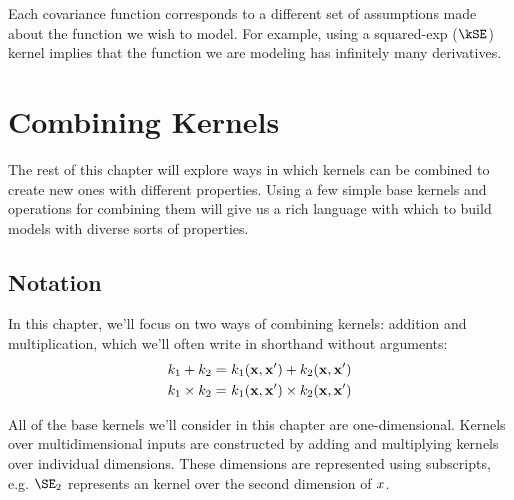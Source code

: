 Each covariance function corresponds to a different set of assumptions made about the function we wish to model.
For example, using a squared-exp ($\kSE$) kernel implies that the function we are modeling has infinitely many derivatives.



\section{Combining Kernels}

The rest of this chapter will explore ways in which kernels can be combined to create new ones with different properties.
Using a few simple base kernels and operations for combining them will give us a rich language with which to build models with diverse sorts of properties.





\subsection{Notation}

In this chapter, we'll focus on two ways of combining kernels: addition and multiplication, which we'll often write in shorthand without arguments:
\begin{align}
k_1 + k_2 =& \,\, k_1({\bf{x}}, {\bf{x}}') + k_2( {\bf{x}}, {\bf{x}}')\\
k_1 \times k_2 =& \,\, k_1({\bf{x}}, {\bf{x}}') \times k_2({\bf{x}}, {\bf{x}}')
\end{align}


All of the base kernels we'll consider in this chapter are one-dimensional.
Kernels over multidimensional inputs are constructed by adding and multiplying kernels over individual dimensions.
These dimensions are represented using subscripts, e.g. $\SE_2$ represents an \kSE{} kernel over the second dimension of $x$.

